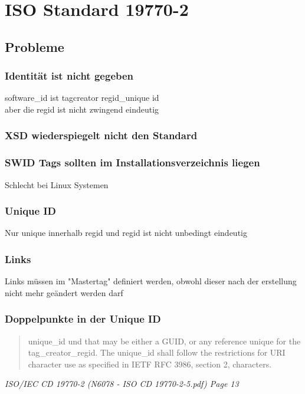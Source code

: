 \section{ISO Standard 19770-2} 

\subsection{Probleme}

\subsubsection{Identität ist nicht gegeben}
software\_id ist tagcreator regid\_unique id\\
aber die regid ist nicht zwingend eindeutig

\subsubsection{XSD wiederspiegelt nicht den Standard}

\subsubsection{SWID Tags sollten im Installationsverzeichnis liegen}
Schlecht bei Linux Systemen

\subsubsection{Unique ID}
Nur unique innerhalb regid und regid ist nicht unbedingt eindeutig

\subsubsection{Links}
Links müssen im "Mastertag" definiert werden, obwohl dieser nach der erstellung
nicht mehr geändert werden darf


\subsubsection{Doppelpunkte in der Unique ID} 
\begin{quote}
unique\_id und that may
be either a GUID, or any reference unique for the tag\_creator\_regid. The
unique\_id shall follow the restrictions for URI character use as specified in
IETF RFC 3986, section 2, characters. 
\end{quote} 
\textit{ISO/IEC CD 19770-2 (N6078 - ISO CD 19770-2-5.pdf) Page 13}


